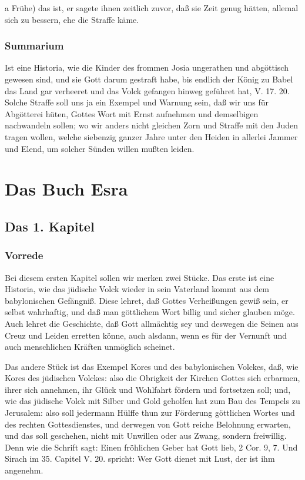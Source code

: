 

a Frühe) das ist, er sagete ihnen zeitlich zuvor, daß sie Zeit genug hätten, allemal sich zu bessern, ehe die Straffe käme.

\section{Summarium}

Ist eine Historia, wie die Kinder des frommen Josia ungerathen und abgöttisch gewesen sind, und sie Gott darum gestraft habe, bis endlich der König zu Babel das Land gar verheeret und das Volck gefangen hinweg geführet hat, V. 17. 20. Solche Straffe soll uns ja ein Exempel und Warnung sein, daß wir uns für Abgötterei hüten, Gottes Wort mit Ernst aufnehmen und demselbigen nachwandeln sollen; wo wir anders nicht gleichen Zorn und Straffe mit den Juden tragen wollen, welche siebenzig ganzer Jahre unter den Heiden in allerlei Jammer und Elend, um solcher Sünden willen mußten leiden.

\part{Das Buch Esra}

\chapter{Das 1. Kapitel}

\section{Vorrede}

Bei diesem ersten Kapitel sollen wir merken zwei Stücke. Das erste ist eine Historia, wie das jüdische Volck wieder in sein Vaterland kommt aus dem babylonischen Gefängniß. Diese lehret, daß Gottes Verheißungen gewiß sein, er selbst wahrhaftig, und daß man göttlichem Wort billig und sicher glauben möge. Auch lehret die Geschichte, daß Gott allmächtig sey und deswegen die Seinen aus Creuz und Leiden erretten könne, auch alsdann, wenn es für der Vernunft und auch menschlichen Kräften unmöglich scheinet.

Das andere Stück ist das Exempel Kores und des babylonischen Volckes, daß, wie Kores des jüdischen Volckes: also die Obrigkeit der Kirchen Gottes sich erbarmen, ihrer sich annehmen, ihr Glück und Wohlfahrt fördern und fortsetzen soll; und, wie das jüdische Volck mit Silber und Gold geholfen hat zum Bau des Tempels zu Jerusalem: also soll jedermann Hülffe thun zur Förderung göttlichen Wortes und des rechten Gottesdienstes, und derwegen von Gott reiche Belohnung erwarten, und das soll geschehen, nicht mit Unwillen oder aus Zwang, sondern freiwillig. Denn wie die Schrift sagt: Einen fröhlichen Geber hat Gott lieb, 2 Cor. 9, 7. Und Sirach im 35. Capitel V. 20. spricht: Wer Gott dienet mit Lust, der ist ihm angenehm.

